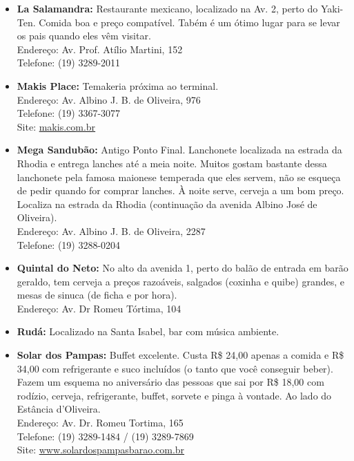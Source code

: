 \begin{itemize}
    \item   \textbf{La Salamandra:} Restaurante mexicano, localizado na Av. 2,
        perto do Yaki-Ten. Comida boa e preço compatível. Tabém é um ótimo lugar
        para se levar os pais quando eles vêm visitar.
        \\Endereço: Av. Prof. Atílio Martini, 152
        \\Telefone: (19) 3289-2011

    \item   \textbf{Makis Place:} Temakeria próxima ao terminal.
        \\Endereço: Av. Albino J. B. de Oliveira, 976
        \\Telefone: (19) 3367-3077
        \\Site: \url{makis.com.br}

    \item   \textbf{Mega Sandubão:} 
      Antigo Ponto Final. Lanchonete localizada na estrada da Rhodia e entrega
      lanches até a meia noite. Muitos gostam bastante dessa lanchonete pela
      famosa maionese temperada que eles servem, não se esqueça de pedir quando
      for comprar lanches. À noite serve, cerveja a um bom preço. Localiza na
      estrada da Rhodia (continuação da avenida Albino José de Oliveira).
        \\Endereço: Av. Albino J. B. de Oliveira, 2287
        \\Telefone: (19) 3288-0204

    \item   \textbf{Quintal do Neto:} No alto da avenida 1, perto do balão de
        entrada em barão geraldo, tem cerveja a preços razoáveis, salgados
        (coxinha e quibe) grandes, e mesas de sinuca (de ficha e por hora).
        \\Endereço: Av. Dr Romeu Tórtima, 104

    \item   \textbf{Rudá:} Localizado na Santa Isabel, bar com música ambiente.

    \item   \textbf{Solar dos Pampas:} Buffet excelente. Custa R\$ 24,00 apenas
        a comida e R\$ 34,00 com refrigerante e suco incluídos (o tanto que você
        conseguir beber). Fazem um esquema no aniversário das pessoas que sai
        por R\$ 18,00 com rodízio, cerveja, refrigerante, buffet, sorvete e
        pinga à vontade. Ao lado do Estância d'Oliveira.
        \\Endereço: Av. Dr. Romeu Tortima, 165
        \\Telefone: (19) 3289-1484 / (19) 3289-7869
        \\Site: \url{www.solardospampasbarao.com.br}


\end{itemize}
